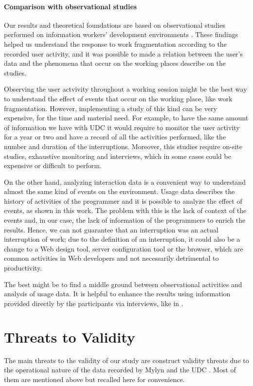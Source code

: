 \documentclass[times]{smrauth}
\begin{document}
\paragraph{Comparison with observational studies}
Our results and theoretical foundations are based on observational studies performed on information workers' development environments \cite{MGH05, IH07, LVD06, PD10}. These findings helped us understand the response to work fragmentation according to the recorded user activity, and it was possible to made a relation between the user's data and the phenomena that occur on the working places describe on the studies.

Observing the user actvivity throughout a working session might be the best way to understand the effect of events that occur on the working place, like work fragmentation. However, implementing a study of this kind can be very expensive, for the time and material need. For example, to have the same amount of information we have with UDC it would require to monitor the user activity for a year or two and have a record of all the activities performed, like the number and duration of the interruptions. Moreover, this studies require on-site studies, exhaustive monitoring and interviews, which in some cases could be expensive or difficult to perform.

On the other hand, analyzing interaction data is a convenient way to understand almost the same kind of events on the environment. Usage data describes the history of activities of the programmer and it is possible to analyze the effect of events, as shown in this work. The problem with this is the lack of context of the events and, in our case, the lack of information of the programmers to enrich the results. Hence, we can not guarantee that an interruption was an actual interruption of work; due to the definition of an interruption, it could also be a change to a Web design tool, server configuration tool or the browser, which are common activities in Web developers and not necessarily detrimental to productivity.

The best might be to find a middle ground between observational activities and analysis of usage data. It is helpful to enhance the results using information provided directly by the participants via interviews, like in \cite{FMH07}.

\section{Threats to Validity}
The main threats to the validity of our study are construct validity threats due to the operational nature of the data recorded by Mylyn and the UDC \cite{M14}. Most of them are mentioned above but recalled here for convenience.
\end{document}
